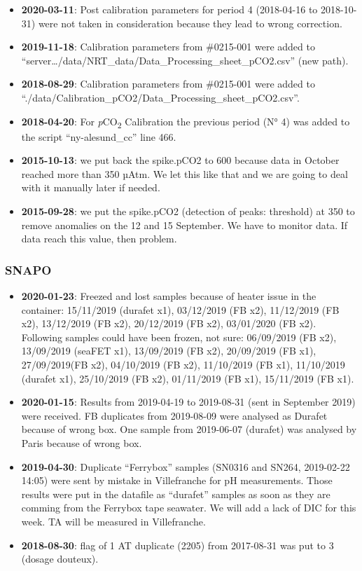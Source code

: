 \documentclass[
]{article}
\providecommand{\tightlist}{%
  \setlength{\itemsep}{0pt}\setlength{\parskip}{0pt}}
\begin{document}
\begin{itemize}
\tightlist
\item
  \textbf{2020-03-11}: Post calibration parameters for period 4
  (2018-04-16 to 2018-10-31) were not taken in consideration because
  they lead to wrong correction.
\item
  \textbf{2019-11-18}: Calibration parameters from \#0215-001 were added
  to ``server\ldots/data/NRT\_data/Data\_Processing\_sheet\_pCO2.csv''
  (new path).
\item
  \textbf{2018-08-29}: Calibration parameters from \#0215-001 were added
  to ``./data/Calibration\_pCO2/Data\_Processing\_sheet\_pCO2.csv''.
\item
  \textbf{2018-04-20}: For \emph{p}CO\textsubscript{2} Calibration the
  previous period (N° 4) was added to the script ``ny-alesund\_cc'' line
  466.
\item
  \textbf{2015-10-13}: we put back the spike.pCO2 to 600 because data in
  October reached more than 350 µAtm. We let this like that and we are
  going to deal with it manually later if needed.
\item
  \textbf{2015-09-28}: we put the spike.pCO2 (detection of peaks:
  threshold) at 350 to remove anomalies on the 12 and 15 September. We
  have to monitor data. If data reach this value, then problem.
\end{itemize}

\hypertarget{snapo}{%
\subsubsection{\texorpdfstring{\textbf{SNAPO}}{SNAPO}}\label{snapo}}

\begin{itemize}
\item
  \textbf{2020-01-23}: Freezed and lost samples because of heater issue
  in the container: 15/11/2019 (durafet x1), 03/12/2019 (FB x2),
  11/12/2019 (FB x2), 13/12/2019 (FB x2), 20/12/2019 (FB x2), 03/01/2020
  (FB x2). Following samples could have been frozen, not sure:
  06/09/2019 (FB x2), 13/09/2019 (seaFET x1), 13/09/2019 (FB x2),
  20/09/2019 (FB x1), 27/09/2019(FB x2), 04/10/2019 (FB x2), 11/10/2019
  (FB x1), 11/10/2019 (durafet x1), 25/10/2019 (FB x2), 01/11/2019 (FB
  x1), 15/11/2019 (FB x1).
\item
  \textbf{2020-01-15}: Results from 2019-04-19 to 2019-08-31 (sent in
  September 2019) were received. FB duplicates from 2019-08-09 were
  analysed as Durafet because of wrong box. One sample from 2019-06-07
  (durafet) was analysed by Paris because of wrong box.
\item
  \textbf{2019-04-30}: Duplicate ``Ferrybox'' samples (SN0316 and SN264,
  2019-02-22 14:05) were sent by mistake in Villefranche for pH
  measurements. Those results were put in the datafile as ``durafet''
  samples as soon as they are comming from the Ferrybox tape seawater.
  We will add a lack of DIC for this week. TA will be measured in
  Villefranche.
\item
  \textbf{2018-08-30}: flag of 1 AT duplicate (2205) from 2017-08-31 was
  put to 3 (dosage douteux).
\end{itemize}
\end{document}
